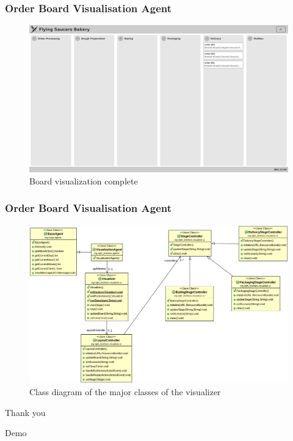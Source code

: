 \documentclass{beamer}
\begin{document}
\begin{frame}
    \frametitle{\huge{Order Board Visualisation Agent}}
    \begin{figure}[H]
            \centering
            \includegraphics[width=0.99\linewidth]{visualizer-complete.png}
            \caption{Board visualization complete}
        \end{figure}
\end{frame}

\begin{frame}
    \frametitle{\huge{Order Board Visualisation Agent}}
    \begin{figure}[H]
            \centering
            \includegraphics[width=0.99\linewidth]{class-diagram.png}
            \caption{Class diagram of the major classes of the visualizer}
        \end{figure}
\end{frame}

\begin{frame}
    \Huge{\centerline{Thank you}}
    \Huge{\centerline{Demo}}
\end{frame}
\end{document}
